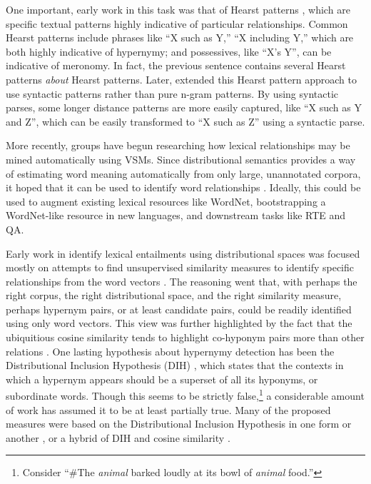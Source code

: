 \documentclass[12pt]{article}
\begin{document}
One important, early work in this task was that of Hearst patterns
\cite{hearst:1992:coling}, which are specific textual patterns highly
indicative of particular relationships. Common Hearst patterns include
phrases like ``X such as Y,'' ``X including Y,'' which are both highly
indicative of hypernymy; and possessives, like ``X's Y'', can be indicative
of meronomy. In fact, the previous sentence contains several Hearst patterns
{\em about} Hearst patterns. Later,
 extended this Hearst pattern approach
to use syntactic patterns rather than
pure n-gram patterns. By using syntactic parses, some longer distance patterns
are more easily captured, like ``X such as Y and Z'', which can be easily
transformed to ``X such as Z'' using a syntactic parse.

More recently, groups have begun researching how lexical relationships may be
mined automatically using VSMs. Since distributional
semantics provides a way of estimating word meaning automatically from only
large, unannotated corpora, it hoped that it can be used to identify
word relationships \cite{baroni:2011:gems,baroni:2012:eacl}. Ideally, this
could be used to augment existing lexical resources like WordNet, bootstrapping
a WordNet-like resource in new languages, and downstream tasks like RTE and QA.

Early work in identify lexical entailments using distributional spaces was
focused mostly on attempts to find unsupervised similarity measures to identify
specific relationships from the word vectors
\cite{weeds:2004:coling,clarke:2009:gems,kotlerman:2010:nle,lenci:2012:starsem,santus:2013:thesis}.
The reasoning went that, with perhaps the right corpus, the right
distributional space, and the right similarity measure, perhaps hypernym pairs,
or at least candidate pairs, could be readily identified using only word
vectors. This view was further highlighted by the fact that the ubiquitious
cosine similarity tends to highlight co-hyponym pairs more than other relations
\cite{weeds:2004:coling,baroni:2011:gems}.  One lasting hypothesis about
hypernymy detection has been the Distributional Inclusion Hypothesis (DIH)
\cite{zhitomirsky-geffet:2005:acl}, which states that the contexts in which a
hypernym appears should be a superset of all its hyponyms, or subordinate
words. Though this seems to be strictly false,\footnote{Consider ``\#The {\em
animal} barked loudly at its bowl of {\em animal} food.''} a considerable
amount of work has assumed it to be at least partially true.  Many of the
proposed measures were based on the Distributional Inclusion Hypothesis in one
form or another \cite{clarke:2009:gems}, or a hybrid of DIH and cosine
similarity \cite{kotlerman:2010:nle,lenci:2012:starsem}.
\end{document}
